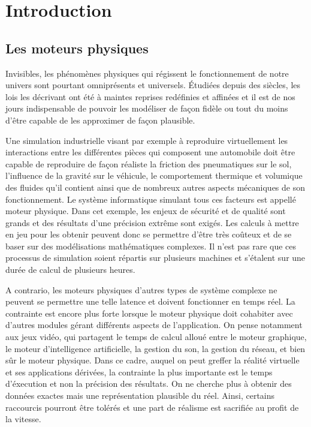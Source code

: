 \section{Introduction}

\subsection{Les moteurs physiques}

Invisibles, les phénomènes physiques qui régissent le fonctionnement
de notre univers sont pourtant omniprésents et universels. \'Etudiées
depuis des siècles, les lois les décrivant ont été à maintes reprises
redéfinies et affinées et il est de nos jours indispensable de pouvoir
les modéliser de façon fidèle ou tout du moins d'être capable de les
approximer de façon plausible.

Une simulation industrielle visant par exemple à reproduire
virtuellement les interactions entre les différentes pièces qui
composent une automobile doit être capable de reproduire de façon
réaliste la friction des pneumatiques sur le sol, l'influence de la
gravité sur le véhicule, le comportement thermique et volumique des
fluides qu'il contient ainsi que de nombreux autres aspects mécaniques
de son fonctionnement. Le système informatique simulant tous ces
facteurs est appellé moteur physique. Dans cet exemple, les enjeux de
sécurité et de qualité sont grands et des résultats d'une précision
extrême sont exigés. Les calculs à mettre en jeu pour les obtenir
peuvent donc se permettre d'être très coûteux et de se baser sur des
modélisations mathématiques complexes. Il n'est pas rare que ces
processus de simulation soient répartis sur plusieurs machines et
s'étalent sur une durée de calcul de plusieurs heures.

A contrario, les moteurs physiques d'autres types de système complexe
ne peuvent se permettre une telle latence et doivent fonctionner en
temps réel. La contrainte est encore plus forte lorsque le moteur
physique doit cohabiter avec d'autres modules gérant différents
aspects de l'application. On pense notamment aux jeux vidéo, qui
partagent le temps de calcul alloué entre le moteur graphique, le
moteur d'intelligence artificielle, la gestion du son, la gestion du
réseau, et bien sûr le moteur physique. Dans ce cadre, auquel on peut
greffer la réalité virtuelle et ses applications dérivées, la
contrainte la plus importante est le temps d'éxecution et non la
précision des résultats. On ne cherche plus à obtenir des données
exactes mais une représentation plausible du réel. Ainsi, certains
raccourcis pourront être tolérés et une part de réalisme est sacrifiée
au profit de la vitesse.

